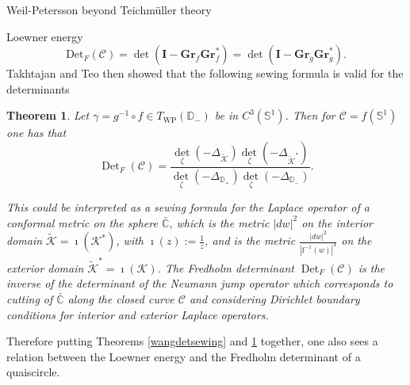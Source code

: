 \documentclass[12pt]{amsart}
\newcommand{\sphere}{\bar{\Bbb{C}}} %
\renewcommand{\Bbb}[1]{\ensuremath{\mathbb{#1}}}
\newcommand{\kap}{\mathscr{K}}
\theoremstyle{plain}
\newtheorem{theorem}{Theorem}[section]
\theoremstyle{definition}
\theoremstyle{remark}
\numberwithin{equation}{section} %
\numberwithin{figure}{section} %
\begin{document}
\begin{section}{Weil-Petersson beyond Teichm\"uller theory}
\begin{subsection}{Loewner energy}
$$\mathrm{Det}_{F}(\mathscr{C})= \det (\mathbf{I}-\mathbf{Gr}_f \mathbf{Gr}_{f}^{\ast})= \det (\mathbf{I}-\mathbf{Gr}_g \mathbf{Gr}_{g}^{\ast}).$$
Takhtajan and Teo then showed that the following sewing formula is valid for the determinants
\begin{theorem}\label{TTdetsewing}
Let \(\gamma={g}^{-1} \circ {f} \in T_{\mathrm{WP}}(\mathbb{D}_-)\) be in \(C^{3}(\mathbb{S}^1)\). Then for
\(\mathscr{C}={f}\left(\mathbb{S}^{1}\right)\) one has that
\begin{equation}\label{TTsewingformula}
    \operatorname{Det}_{F}(\mathcal{C})=\frac{\operatorname{det}_{\zeta}(-\Delta_{\tilde{\kap}}) \operatorname{det}_\zeta(- \Delta_{\tilde{\kap}^{*}})}{\operatorname{det}_{\zeta} (-\Delta_{\mathbb{D}_+}) \operatorname{det}_{\zeta}(-\Delta_{\mathbb{D}_{-}})}
.
\end{equation}

This could be interpreted as a sewing formula for the Laplace operator of a conformal metric
on the sphere \(\sphere\), which is the metric $|dw|^2$ on the interior domain \(\tilde{\kap}=\imath\left(\kap^{*}\right)\), with $\imath(z):=\frac{1}{z}$, and is the metric \(\frac{|dw|^2}{\left|\mathrm{f}^{-1}(w)\right|^{4}}\) on the exterior domain \(\tilde{\kap}^{*}=\imath(\kap)\). The Fredholm determinant \(\operatorname{Det}_{F}(\mathscr{C})\) is the inverse of the determinant of the Neumann jump operator which corresponds to cutting of \(\sphere\)
along the closed curve \(\mathscr{C}\) and considering Dirichlet boundary conditions for interior and exterior Laplace operators.
\end{theorem}

{Therefore putting Theorems \ref{wangdetsewing} and  \ref{TTdetsewing} together, one also sees a relation between the Loewner energy and the Fredholm determinant of a quaiscircle.}


\end{subsection}
\end{section}
\end{document}
